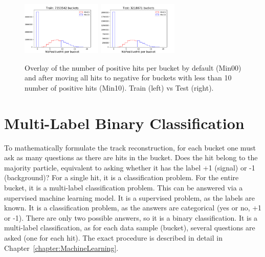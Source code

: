 \begin{figure}[htb]
\centering
\includegraphics[width=0.34\textwidth]{plots/plot_bucket_unbalanced_Train.pdf}
\includegraphics[width=0.34\textwidth]{plots/plot_bucket_unbalanced_Test.pdf}
\caption{Overlay of the number of positive hits per bucket by default (Min00) and after moving all hits to negative for buckets with less than 10 number of positive hits (Min10). Train (left) vs Test (right).}
\label{fig:BucketUnbalanced}
\end{figure}

\section{Multi-Label Binary Classification}
\label{sec:MultiLabelBinaryClassification}

To mathematically formulate the track reconstruction, for each bucket one must ask as many questions as there are hits in the bucket. Does the hit belong to the majority particle, equivalent to asking whether it has the label +1 (signal) or -1 (background)? For a single hit, it is a classification problem. For the entire bucket, it is a multi-label classification problem. This can be answered via a supervised machine learning model. It is a supervised problem, as the labels are known. It is a classification problem, as the answers are categorical (yes or no, +1 or -1). There are only two possible answers, so it is a binary classification. It is a multi-label classification, as for each data sample (bucket), several questions are asked (one for each hit). The exact procedure is described in detail in Chapter~\ref{chapter:MachineLearning}.
